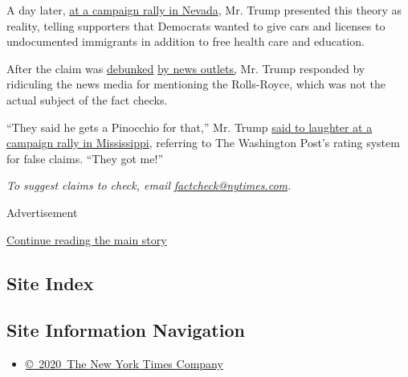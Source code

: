 A day later,
\href{https://www.c-span.org/video/?453249-1/president-trump-campaigns-nevada-republican-senator-dean-heller}{at
a campaign rally in Nevada}, Mr. Trump presented this theory as reality,
telling supporters that Democrats wanted to give cars and licenses to
undocumented immigrants in addition to free health care and education.

After the claim was
\href{https://www.snopes.com/fact-check/democrats-free-cars-immigrants/}{debunked}
\href{https://www.politifact.com/truth-o-meter/statements/2018/oct/22/donald-trump/donald-trump-says-democrats-want-give-cars-undocum/}{by
news outlets,} Mr. Trump responded by ridiculing the news media for
mentioning the Rolls-Royce, which was not the actual subject of the fact
checks.

``They said he gets a Pinocchio for that,'' Mr. Trump
\href{https://www.youtube.com/watch?time_continue=1318\&v=0ri5QQVhJhg}{said
to laughter at a campaign rally in Mississippi}, referring to The
Washington Post's rating system for false claims. ``They got me!''

\emph{To suggest claims to check, email}
\href{mailto:factcheck@nytimes.com}{\emph{factcheck@nytimes.com}}\emph{.}

Advertisement

\protect\hyperlink{after-bottom}{Continue reading the main story}

\hypertarget{site-index}{%
\subsection{Site Index}\label{site-index}}

\hypertarget{site-information-navigation}{%
\subsection{Site Information
Navigation}\label{site-information-navigation}}

\begin{itemize}
\tightlist
\item
  \href{https://help.nytimes.com/hc/en-us/articles/115014792127-Copyright-notice}{©~2020~The
  New York Times Company}
\end{itemize}

